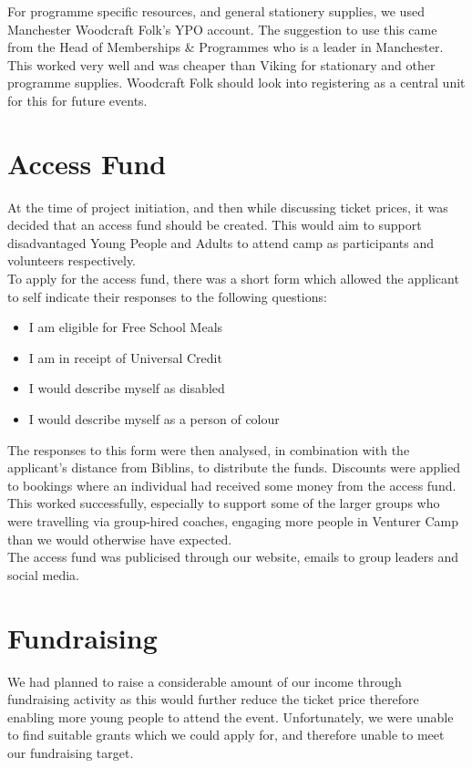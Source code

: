 For programme specific resources, and general stationery supplies, we used Manchester Woodcraft Folk's YPO account. The suggestion to use this came from the Head of Memberships \& Programmes who is a leader in Manchester. This worked very well and was cheaper than Viking for stationary and other programme supplies. Woodcraft Folk should look into registering as a central unit for this for future events. 

\section{Access Fund}
At the time of project initiation, and then while discussing ticket prices, it was decided that an access fund should be created. This would aim to support disadvantaged Young People and Adults to attend camp as participants and volunteers respectively.\\

To apply for the access fund, there was a short form which allowed the applicant to self indicate their responses to the following questions:
\begin{itemize}
    \item I am eligible for Free School Meals
    \item I am in receipt of Universal Credit
    \item I would describe myself as disabled
    \item I would describe myself as a person of colour
\end{itemize}
The responses to this form were then analysed, in combination with the applicant's distance from Biblins, to distribute the funds. Discounts were applied to bookings where an individual had received some money from the access fund.\\

This worked successfully, especially to support some of the larger groups who were travelling via group-hired coaches, engaging more people in Venturer Camp than we would otherwise have expected.\\

The access fund was publicised through our website, emails to group leaders and social media.

\section{Fundraising}
We had planned to raise a considerable amount of our income through fundraising activity as this would further reduce the ticket price therefore enabling more young people to attend the event. Unfortunately, we were unable to find suitable grants which we could apply for, and therefore unable to meet our fundraising target.\\

